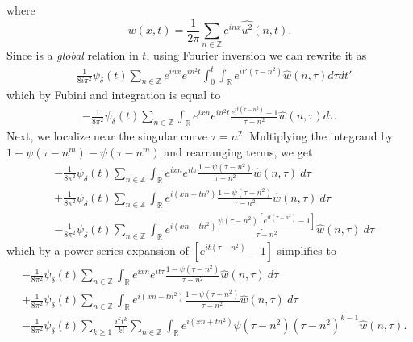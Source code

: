 \documentclass[12pt,reqno]{amsart}
\numberwithin{equation}{section}  %
\renewcommand{\cref}{\Cref}
\newcommand{\rr}{\mathbb{R}}
\newcommand{\zz}{\mathbb{Z}}
\newcommand{\wh}{\widehat}
\begin{document}
where $$w(x,t) = \frac{1}{2\pi} \sum_{n \in \zz}
e^{inx} \wh{u^{2}}(n,t).$$
Since \cref{term-3} is a \emph{global} relation in $t$, using Fourier inversion
we can rewrite it as
%
%
\begin{equation*}
\begin{split}
  & \frac{1}{8 i \pi^{2} } \psi_{\delta}(t) \sum_{n \in \zz} e^{inx} e^{in^{2}t}
  \int_{0}^{t} \int_{\rr} e^{it'(\tau - n^{2})} \wh{w}(n, \tau) d \tau dt'
\end{split}
\end{equation*}
%
%
which by Fubini and integration is equal to
%
%
\begin{equation*}
\begin{split}
  -\frac{1}{8 \pi^{2}} \psi_{\delta} (t) \sum_{n \in \zz} \int_{\rr} e^{ixn}
  e^{in^{2}t} \frac{e^{it(\tau - n^{2})} -1}{ \tau - n^{2}}\wh{w}(n, \tau) d \tau.
\end{split}
\end{equation*}
%
Next, we localize near the singular curve $\tau =  n^2$.  Multiplying the
integrand by $1 + \psi(\tau -
n^m) - \psi(\tau -
n^m) $ and
rearranging terms, we get
%
%
\begin{equation*}
	\begin{split}
	& - \frac{1}{8 \pi^2} \psi_{\delta}(t) \sum_{n \in \zz} \int_\rr e^{ixn}  
		e^{it \tau} \frac{ 1 - \psi(\tau - n^{2}) 
		}{\tau - n^{2}} \wh{w}(n, \tau) \ d \tau
		\\
		& + \frac{1}{8 \pi^2} \psi_{\delta}(t) \sum_{n \in \zz} \int _\rr e^{i(xn + 
		t n^{2})}
		 \frac{1- \psi(\tau - n^{2})}{\tau - n^{2}} \wh{w}(n, \tau) \ d \tau
		\\
		& - \frac{1}{8 \pi^2} \psi_{\delta}(t) \sum_{n \in \zz} \int_\rr
		e^{i(xn + t n^{2})}
		\frac{\psi(\tau - n^{2})\left[ e^{it(\tau - n^{2})}-1 
		\right]}{\tau - n^{2}} \wh{w}(n, \tau) \ d \tau
	\end{split}
\end{equation*}
%
%
which by a power series expansion of $[e^{it(\tau - n^{2})}-1]$ simplifies  
to
%
%
\begin{align}
		\label{main-int-expression'-2}
		& -\frac{1}{8 \pi^2} \psi_{\delta}(t) \sum_{n\in \zz} \int_\rr e^{ixn}  
		e^{it \tau} \frac{ 1 - \psi(\tau -  n^{2}) 
		}{\tau -  n^{2}} \wh{w}(n, \tau) \ d \tau
		\\
		\label{main-int-expression'-3}
		& + \frac{1}{8 \pi^2} \psi_{\delta}(t) \sum_{n\in \zz} \int_\rr e^{i(xn + 
		t n^{2})}
		 \frac{1- \psi(\tau -  n^{2})}{\tau -  n^{2}} \wh{w}(n, \tau) \ d \tau
		\\
		\label{main-int-expression'-4}
		& - \frac{1}{8 \pi^2} \psi_{\delta}(t) \sum_{k \ge 1} \frac{i^k t^k}{k!}
		\sum_{n \in \zz} \int_\rr e^{i(xn + t n^{2} )}
		\psi(\tau -  n^{2}) (\tau -  n^{2})^{k-1} \wh{w}(n, \tau).
\end{align}
\end{document}
